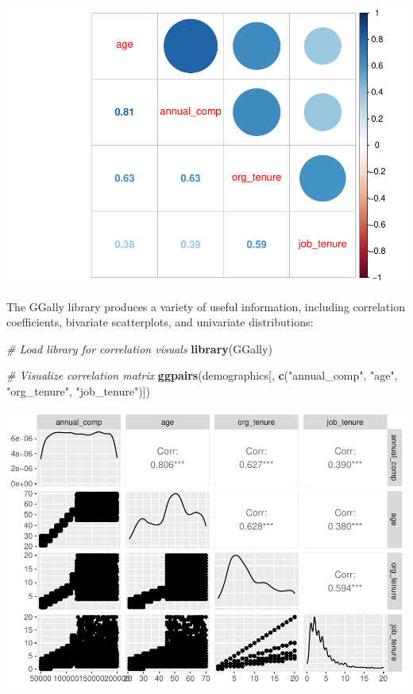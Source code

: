 \documentclass[]{book}
\newenvironment{Shaded}{\begin{snugshade}}{\end{snugshade}}
\newcommand{\CommentTok}[1]{\textcolor[rgb]{0.56,0.35,0.01}{\textit{#1}}}
\newcommand{\KeywordTok}[1]{\textcolor[rgb]{0.13,0.29,0.53}{\textbf{#1}}}
\newcommand{\NormalTok}[1]{#1}
\newcommand{\StringTok}[1]{\textcolor[rgb]{0.31,0.60,0.02}{#1}}
\begin{document}
\includegraphics{People_Analytics_Lifecycle_files/figure-latex/unnamed-chunk-32-1.pdf}

The GGally library produces a variety of useful information, including correlation coefficients, bivariate scatterplots, and univariate distributions:

\begin{Shaded}
\begin{Highlighting}[]
\CommentTok{# Load library for correlation visuals}
\KeywordTok{library}\NormalTok{(GGally)}

\CommentTok{# Visualize correlation matrix}
\KeywordTok{ggpairs}\NormalTok{(demographics[, }\KeywordTok{c}\NormalTok{(}\StringTok{"annual_comp"}\NormalTok{, }\StringTok{"age"}\NormalTok{, }\StringTok{"org_tenure"}\NormalTok{, }\StringTok{"job_tenure"}\NormalTok{)])}
\end{Highlighting}
\end{Shaded}

\includegraphics{People_Analytics_Lifecycle_files/figure-latex/unnamed-chunk-33-1.pdf}
\end{document}
